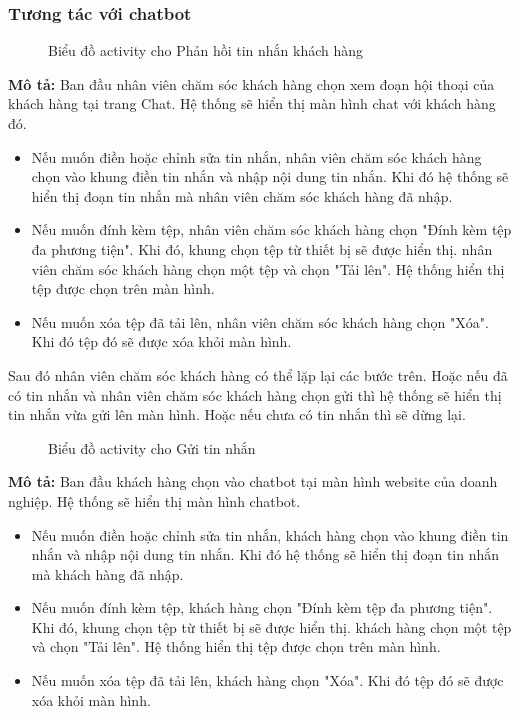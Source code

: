 \subsubsection{Tương tác với chatbot}
\begin{figure}[H]
    \centering
     
    \vspace{0.5cm}
    \caption{Biểu đồ activity cho Phản hồi tin nhắn khách hàng}
    \label{fig:enter-label}
\end{figure}
\textbf{Mô tả:}
Ban đầu nhân viên chăm sóc khách hàng chọn xem đoạn hội thoại của khách hàng tại trang Chat. Hệ thống sẽ hiển thị màn hình chat với khách hàng đó.
\begin{itemize}
    \item Nếu muốn điền hoặc chỉnh sửa tin nhắn, nhân viên chăm sóc khách hàng chọn vào khung điền tin nhắn và nhập nội dung tin nhắn. Khi đó hệ thống sẽ hiển thị đoạn tin nhắn mà nhân viên chăm sóc khách hàng đã nhập.
    \item Nếu muốn đính kèm tệp, nhân viên chăm sóc khách hàng chọn "Đính kèm tệp đa phương tiện". Khi đó, khung chọn tệp từ thiết bị sẽ được hiển thị. nhân viên chăm sóc khách hàng chọn một tệp và chọn "Tải lên". Hệ thống hiển thị tệp được chọn trên màn hình.
    \item Nếu muốn xóa tệp đã tải lên, nhân viên chăm sóc khách hàng chọn "Xóa". Khi đó tệp đó sẽ được xóa khỏi màn hình.
\end{itemize}
Sau đó nhân viên chăm sóc khách hàng có thể lặp lại các bước trên. Hoặc nếu đã có tin nhắn và nhân viên chăm sóc khách hàng chọn gửi thì hệ thống sẽ hiển thị tin nhắn vừa gửi lên màn hình. Hoặc nếu chưa có tin nhắn thì sẽ dừng lại.
\begin{figure}[H]
    \centering
     
    \vspace{0.5cm}
    \caption{Biểu đồ activity cho Gửi tin nhắn}
    \label{fig:enter-label}
\end{figure}
\textbf{Mô tả:}
Ban đầu khách hàng chọn vào chatbot tại màn hình website của doanh nghiệp. Hệ thống sẽ hiển thị màn hình chatbot.
\begin{itemize}
    \item Nếu muốn điền hoặc chỉnh sửa tin nhắn, khách hàng chọn vào khung điền tin nhắn và nhập nội dung tin nhắn. Khi đó hệ thống sẽ hiển thị đoạn tin nhắn mà khách hàng đã nhập.
    \item Nếu muốn đính kèm tệp, khách hàng chọn "Đính kèm tệp đa phương tiện". Khi đó, khung chọn tệp từ thiết bị sẽ được hiển thị. khách hàng chọn một tệp và chọn "Tải lên". Hệ thống hiển thị tệp được chọn trên màn hình.
    \item Nếu muốn xóa tệp đã tải lên, khách hàng chọn "Xóa". Khi đó tệp đó sẽ được xóa khỏi màn hình.
\end{itemize}

